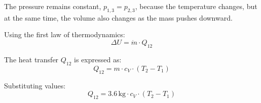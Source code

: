 The pressure remains constant, \( p_{1,3} = p_{2,3} \), because the temperature changes, but at the same time, the volume also changes as the mass pushes downward.

Using the first law of thermodynamics:  
\[
\Delta U = \dot{m} \cdot Q_{12}
\]

The heat transfer \( Q_{12} \) is expressed as:  
\[
Q_{12} = m \cdot c_V \cdot (T_2 - T_1)
\]

Substituting values:  
\[
Q_{12} = 3.6 \, \text{kg} \cdot c_V \cdot (T_2 - T_1)
\]